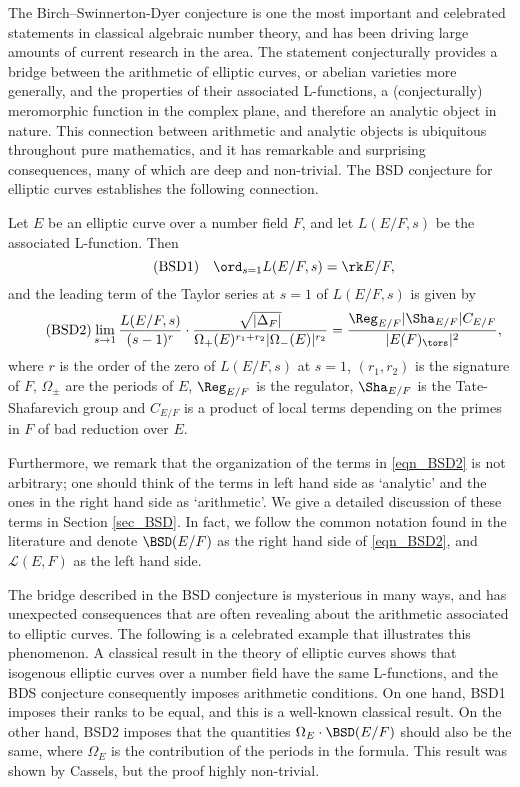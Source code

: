 The Birch--Swinnerton-Dyer conjecture is one the most important and celebrated statements in classical algebraic number theory, and has been driving large amounts of current research in the area. The statement conjecturally provides a bridge between the arithmetic of elliptic curves, or abelian varieties more generally, and the properties of their associated L-functions, a (conjecturally) meromorphic function in the complex plane, and therefore an analytic object in nature. This connection between arithmetic and analytic objects is ubiquitous throughout pure mathematics, and it has remarkable and surprising consequences, many of which are deep and non-trivial. The BSD conjecture for elliptic curves establishes the following connection.

\begin{conj}
    Let $E$ be an elliptic curve over a number field $F$, and let $L(E/F,s)$ be the associated L-function. Then
    \begin{equation}\label{eqn_BSD1}\tag{BSD1}
        \quad\ord_{s=1}L(E/F,s)=\rk E/F,
    \end{equation}
    and the leading term of the Taylor series at $s=1$ of $L(E/F,s)$ is given by
    \begin{equation}\label{eqn_BSD2}\tag{BSD2}
        \lim_{s\to1}\frac{L(E/F,s)}{(s-1)^r}\cdot\frac{\sqrt{|\Delta_F|}}{\Omega_+(E)^{r_1+r_2}|\Omega_-(E)|^{r_2}}=\frac{\Reg_{E/F}|\Sha_{E/F}|C_{E/F}}{|E(F)_{\tors}|^2},
    \end{equation}
    where $r$ is the order of the zero of $L(E/F,s)$ at $s=1$, $(r_1,r_2)$ is the signature of $F$, $\Omega_{\pm}$ are the periods of $E$, $\Reg_{E/F}$ is the regulator, $\Sha_{E/F}$ is the Tate-Shafarevich group and $C_{E/F}$ is a product of local terms depending on the primes in $F$ of bad reduction over $E$.
\end{conj}

Furthermore, we remark that the organization of the terms in \eqref{eqn_BSD2} is not arbitrary; one should think of the terms in left hand side as `analytic' and the ones in the right hand side as `arithmetic'. We give a detailed discussion of these terms in Section \ref{sec_BSD}. In fact, we follow the common notation found in the literature and denote $\BSD(E/F)$ as the right hand side of \eqref{eqn_BSD2}, and $\mathcal{L}(E,F)$ as the left hand side.

The bridge described in the BSD conjecture is mysterious in many ways, and has unexpected consequences that are often revealing about the arithmetic associated to elliptic curves. The following is a celebrated example that illustrates this phenomenon. A classical result in the theory of elliptic curves shows that isogenous elliptic curves over a number field have the same L-functions, and the BDS conjecture consequently imposes arithmetic conditions. On one hand, BSD1 imposes their ranks to be equal, and this is a well-known classical result. On the other hand, BSD2 imposes that the quantities $\Omega_E\cdot\BSD(E/F)$ should also be the same, where $\Omega_E$ is the contribution of the periods in the formula. This result was shown by Cassels, but the proof highly non-trivial. 

